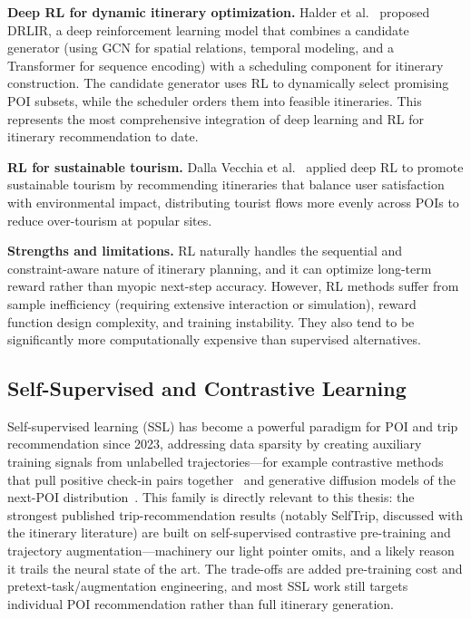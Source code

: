 \textbf{Deep RL for dynamic itinerary optimization.} Halder et al.~\cite{halder2025drlir} proposed DRLIR, a deep reinforcement learning model that combines a candidate generator (using GCN for spatial relations, temporal modeling, and a Transformer for sequence encoding) with a scheduling component for itinerary construction. The candidate generator uses RL to dynamically select promising POI subsets, while the scheduler orders them into feasible itineraries. This represents the most comprehensive integration of deep learning and RL for itinerary recommendation to date.

\textbf{RL for sustainable tourism.} Dalla Vecchia et al.~\cite{dallavecchia2024sustainable} applied deep RL to promote sustainable tourism by recommending itineraries that balance user satisfaction with environmental impact, distributing tourist flows more evenly across POIs to reduce over-tourism at popular sites.

\textbf{Strengths and limitations.} RL naturally handles the sequential and constraint-aware nature of itinerary planning, and it can optimize long-term reward rather than myopic next-step accuracy. However, RL methods suffer from sample inefficiency (requiring extensive interaction or simulation), reward function design complexity, and training instability. They also tend to be significantly more computationally expensive than supervised alternatives.

\subsection{Self-Supervised and Contrastive Learning}
\label{sec:sota-dl-ssl}

Self-supervised learning (SSL) has become a powerful paradigm for POI and trip recommendation since 2023, addressing data sparsity by creating auxiliary training signals from unlabelled trajectories---for example contrastive methods that pull positive check-in pairs together~\cite{duan2023clsprec} and generative diffusion models of the next-POI distribution~\cite{qin2023diffpoi}. This family is directly relevant to this thesis: the strongest published trip-recommendation results (notably SelfTrip, discussed with the itinerary literature) are built on self-supervised contrastive pre-training and trajectory augmentation---machinery our light pointer omits, and a likely reason it trails the neural state of the art. The trade-offs are added pre-training cost and pretext-task/augmentation engineering, and most SSL work still targets individual POI recommendation rather than full itinerary generation.

